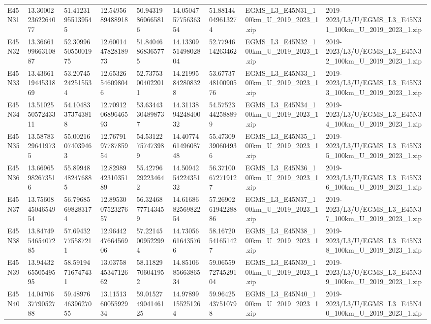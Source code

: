\begin{landscape}
\begin{longtable}{lllllllll}
E45N31 & 13.300022362264077 & 51.41231955139545 & 12.5495689488918 & 50.94319860665816 & 14.050475775636354 & 51.88144049613274 & EGMS\_L3\_E45N31\_100km\_U\_2019\_2023\_1.zip & 2019-2023/L3/U/EGMS\_L3\_E45N31\_100km\_U\_2019\_2023\_1.zip \\
E45N32 & 13.366619966310887 & 52.309965055001975 & 12.600144782818973 & 51.84046868365775 & 14.133095149802804 & 52.7794614263462 & EGMS\_L3\_E45N32\_100km\_U\_2019\_2023\_1.zip & 2019-2023/L3/U/EGMS\_L3\_E45N32\_100km\_U\_2019\_2023\_1.zip \\
E45N33 & 13.436611944531869 & 53.20745242515534 & 12.65326546098046 & 52.73753004022011 & 14.21995842808328 & 53.677374810090576 & EGMS\_L3\_E45N33\_100km\_U\_2019\_2023\_1.zip & 2019-2023/L3/U/EGMS\_L3\_E45N33\_100km\_U\_2019\_2023\_1.zip \\
E45N34 & 13.510255057243311 & 54.10483373743818 & 12.709120689646593 & 53.63443304898737 & 14.311389424840032 & 54.57523442588899 & EGMS\_L3\_E45N34\_100km\_U\_2019\_2023\_1.zip & 2019-2023/L3/U/EGMS\_L3\_E45N34\_100km\_U\_2019\_2023\_1.zip \\
E45N35 & 13.58783296419735 & 55.00216074039463 & 12.767919778785954 & 54.53122757473989 & 14.407746149608748 & 55.47309390604936 & EGMS\_L3\_E45N35\_100km\_U\_2019\_2023\_1.zip & 2019-2023/L3/U/EGMS\_L3\_E45N35\_100km\_U\_2019\_2023\_1.zip \\
E45N36 & 13.66965982673516 & 55.89948482476885 & 12.829894231035189 & 55.42796292234642 & 14.509425422435132 & 56.37100672719127 & EGMS\_L3\_E45N36\_100km\_U\_2019\_2023\_1.zip & 2019-2023/L3/U/EGMS\_L3\_E45N36\_100km\_U\_2019\_2023\_1.zip \\
E45N37 & 13.756084504654954 & 56.79685698283174 & 12.895300752327657 & 56.32468777143459 & 14.616868256982254 & 57.269026194228886 & EGMS\_L3\_E45N37\_100km\_U\_2019\_2023\_1.zip & 2019-2023/L3/U/EGMS\_L3\_E45N37\_100km\_U\_2019\_2023\_1.zip \\
E45N38 & 13.847495465407285 & 57.69432775587211 & 12.964424766456906 & 57.22145009522994 & 14.73056616435766 & 58.16720541651427 & EGMS\_L3\_E45N38\_100km\_U\_2019\_2023\_1.zip & 2019-2023/L3/U/EGMS\_L3\_E45N38\_100km\_U\_2019\_2023\_1.zip \\
E45N39 & 13.944326550549595 & 58.59194716747431 & 13.037584534712662 & 58.11829706041952 & 14.851068566386534 & 59.065597274529104 & EGMS\_L3\_E45N39\_100km\_U\_2019\_2023\_1.zip & 2019-2023/L3/U/EGMS\_L3\_E45N39\_100km\_U\_2019\_2023\_1.zip \\
E45N40 & 14.047063779052788 & 59.489764639627055 & 13.115136005592934 & 59.015274904146125 & 14.97899155251264 & 59.96425437510798 & EGMS\_L3\_E45N40\_100km\_U\_2019\_2023\_1.zip & 2019-2023/L3/U/EGMS\_L3\_E45N40\_100km\_U\_2019\_2023\_1.zip \\

\end{longtable}
\end{landscape}
